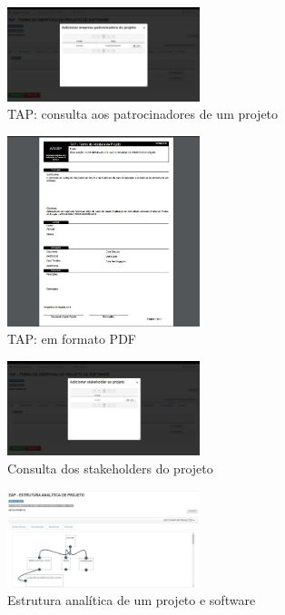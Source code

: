 \documentclass{acm_proc_article-sp}
\begin{document}
\begin{appendices}
\begin{figure}[h]
\centering %
\includegraphics[width=0.5\textwidth]{RF_TAPDetalhamento_addPatrocinador.jpg} %
\caption{TAP: consulta aos patrocinadores de um projeto}
\end{figure}

\begin{figure}[h]
\centering %
\includegraphics[width=0.5\textwidth]{RF_Termo_de_Abertura_de_projeto_em_PDF.jpg} %
\caption{TAP: em formato PDF}
\end{figure}


\begin{figure}[h]
\centering %
\includegraphics[width=0.5\textwidth]{RF_TAPDetalhamento_stakeholder.jpg} %
\caption{Consulta dos stakeholders do projeto}
\end{figure}

\begin{figure}[h]
\centering %
\includegraphics[width=0.5\textwidth]{RF_Eap_do_projeto_de_software.jpg} %
\caption{Estrutura analítica de um projeto e software}
\end{figure}


\end{appendices}
\end{document}
